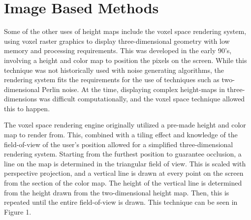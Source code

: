 \documentclass[10pt]{report}
\begin{document}
		
		
		
	\vspace{10pt}
	\let\clearpage\relax
	\chapter{Image Based Methods}
	
		Some of the other uses of height maps include the voxel space rendering system, using voxel raster graphics to display three-dimensional geometry with low memory and processing requirements. This was developed in the early 90's, involving a height and color map to position the pixels on the screen. While this technique was not historically used with noise generating algorithms, the rendering system fits the requirements for the use of techniques such as two-dimensional Perlin noise. At the time, displaying complex height-maps in three-dimensions was difficult computationally, and the voxel space technique allowed this to happen. 
		
		The voxel space rendering engine originally utilized a pre-made height and color map to render from. This, combined with a tiling effect and knowledge of the field-of-view of the user's position allowed for a simplified three-dimensional rendering system. Starting from the furthest position to guarantee occlusion, a line on the map is determined in the triangular field of view. This is scaled with perspective projection, and a vertical line is drawn at every point on the screen from the section of the color map. The height of the vertical line is determined from the height drawn from the two-dimensional height map. Then, this is repeated until the entire field-of-view is drawn. This technique can be seen in Figure 1. 
		
\end{document}
